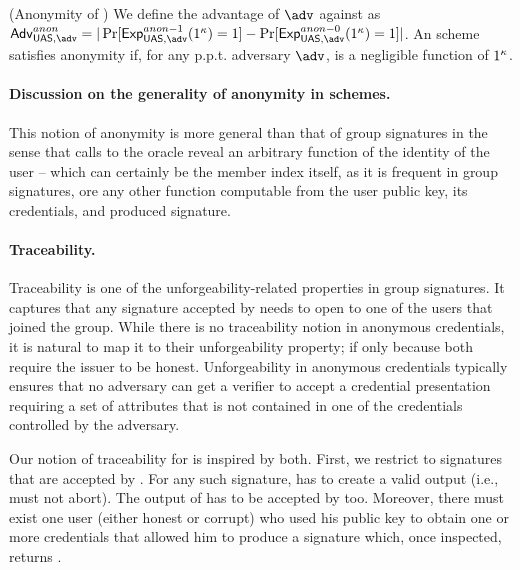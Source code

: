 \begin{definition}{(Anonymity of \UAS)}
  We define the advantage \AdvAnon of $\adv$ against \ExpAnonb as
  $\AdvAnon=|\Pr\lbrack\ExpAnono(1^\secpar)=1\rbrack-
  \Pr\lbrack\ExpAnonz(1^\secpar)=1\rbrack|$.
  An \UAS scheme satisfies anonymity if, for any p.p.t. adversary $\adv$,
  \AdvAnon is a negligible function of $1^\kappa$.
\end{definition}

\paragraph{Discussion on the generality of anonymity in \UAS schemes.} %
This notion of anonymity is more general than that of group signatures in the
sense that calls to the \INSPECT oracle reveal an arbitrary function of the
identity of the user -- which can certainly be the member index itself, as it
is frequent in group signatures, ore any other function computable from the
user public key, its credentials, and produced signature. 

\paragraph{Traceability.} %
Traceability is one of the unforgeability-related properties in group
signatures. It captures that any signature accepted by \Verify needs to open
to one of the users that joined the group. While there is no traceability notion
in anonymous credentials, it is natural to map it to their unforgeability
property; if only because both require the issuer to be honest. Unforgeability
in anonymous credentials typically ensures that no adversary can get a verifier
to accept a credential presentation requiring a set of attributes that is not
contained in one of the credentials controlled by the adversary.

Our notion of traceability for \UAS is inspired by both. First, we restrict to
signatures that are accepted by \Verify. For any such signature, \Inspect has to
create a valid output (i.e., must not abort). The output of \Inspect has to be
accepted by \Judge too. Moreover, there must exist one user (either honest or
corrupt) who used his public key to obtain one or more credentials that allowed
him to produce a signature which, once inspected, returns \y.

